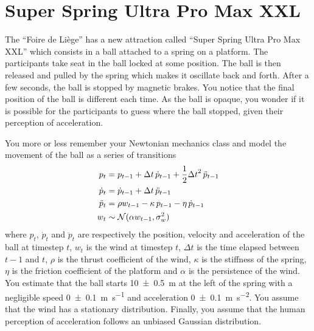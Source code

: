 \documentclass[11pt, a4paper]{article}
\begin{document}
\newpage

\section{Super Spring Ultra Pro Max XXL}

The \enquote{Foire de Liège} has a new attraction called \enquote{Super Spring Ultra Pro Max XXL} which consists in a ball attached to a spring on a platform. The participants take seat in the ball locked at some position. The ball is then released and pulled by the spring which makes it oscillate back and forth. After a few seconds, the ball is stopped by magnetic brakes. You notice that the final position of the ball is different each time. As the ball is opaque, you wonder if it is possible for the participants to guess where the ball stopped, given their perception of acceleration.

You more or less remember your Newtonian mechanics class and model the movement of the ball as a series of transitions
\begin{align*}
    p_t & = p_{t-1} + \Delta t \, \dot{p}_{t-1} + \frac{1}{2} {\Delta t}^2 \, \ddot{p}_{t-1} \\
    \dot{p}_t & = \dot{p}_{t-1} + \Delta t \, \ddot{p}_{t-1} \\
    \ddot{p}_t & = \rho w_{t-1} - \kappa \, p_{t-1} - \eta \, \dot{p}_{t-1} \\
    w_t & \sim \mathcal{N}(\alpha w_{t-1}, \sigma_w^2)
\end{align*}
where $p_t$, $\dot{p}_t$ and $\ddot{p}_t$ are respectively the position, velocity and acceleration of the ball at timestep $t$, $w_t$ is the wind at timestep $t$, $\Delta t$ is the time elapsed between $t-1$ and $t$, $\rho$ is the thrust coefficient of the wind, $\kappa$ is the stiffness of the spring, $\eta$ is the friction coefficient of the platform and $\alpha$ is the persistence of the wind. You estimate that the ball starts \qty{10 \pm 0.5}{\meter} at the left of the spring with a negligible speed \qty{0 \pm 0.1}{\meter\per\second} and acceleration \qty{0 \pm 0.1}{\meter\per\second\squared}. You assume that the wind has a stationary distribution. Finally, you assume that the human perception of acceleration follows an unbiased Gaussian distribution.
\end{document}
